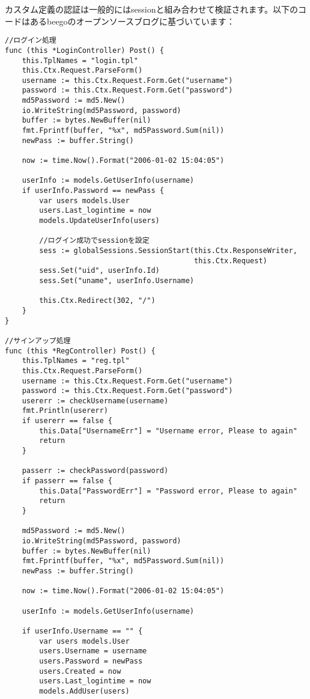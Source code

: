カスタム定義の認証は一般的にはsessionと組み合わせて検証されます。以下のコードはあるbeegoのオープンソースブログに基づいています：

\begin{lstlisting}[numbers=none]
//ログイン処理
func (this *LoginController) Post() {
    this.TplNames = "login.tpl"
    this.Ctx.Request.ParseForm()
    username := this.Ctx.Request.Form.Get("username")
    password := this.Ctx.Request.Form.Get("password")
    md5Password := md5.New()
    io.WriteString(md5Password, password)
    buffer := bytes.NewBuffer(nil)
    fmt.Fprintf(buffer, "%x", md5Password.Sum(nil))
    newPass := buffer.String()

    now := time.Now().Format("2006-01-02 15:04:05")

    userInfo := models.GetUserInfo(username)
    if userInfo.Password == newPass {
        var users models.User
        users.Last_logintime = now
        models.UpdateUserInfo(users)

        //ログイン成功でsessionを設定
        sess := globalSessions.SessionStart(this.Ctx.ResponseWriter,
                                            this.Ctx.Request)
        sess.Set("uid", userInfo.Id)
        sess.Set("uname", userInfo.Username)

        this.Ctx.Redirect(302, "/")
    }    
}

//サインアップ処理
func (this *RegController) Post() {
    this.TplNames = "reg.tpl"
    this.Ctx.Request.ParseForm()
    username := this.Ctx.Request.Form.Get("username")
    password := this.Ctx.Request.Form.Get("password")
    usererr := checkUsername(username)
    fmt.Println(usererr)
    if usererr == false {
        this.Data["UsernameErr"] = "Username error, Please to again"
        return
    }

    passerr := checkPassword(password)
    if passerr == false {
        this.Data["PasswordErr"] = "Password error, Please to again"
        return
    }

    md5Password := md5.New()
    io.WriteString(md5Password, password)
    buffer := bytes.NewBuffer(nil)
    fmt.Fprintf(buffer, "%x", md5Password.Sum(nil))
    newPass := buffer.String()

    now := time.Now().Format("2006-01-02 15:04:05")

    userInfo := models.GetUserInfo(username)

    if userInfo.Username == "" {
        var users models.User
        users.Username = username
        users.Password = newPass
        users.Created = now
        users.Last_logintime = now
        models.AddUser(users)


\end{lstlisting}

